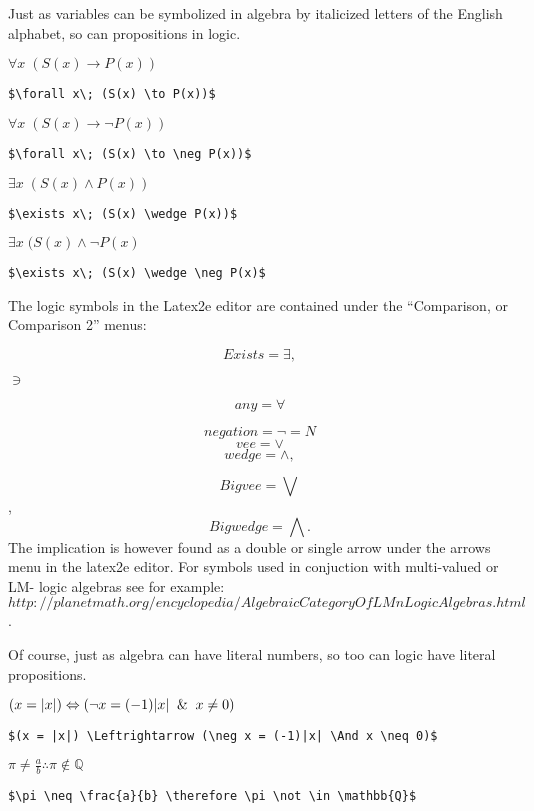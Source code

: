 Just as variables can be symbolized in algebra by italicized letters of the English alphabet, so can propositions in logic.

$\forall x\; (S(x) \to P(x))$

\verb=$\forall x\; (S(x) \to P(x))$=

$\forall x\; (S(x) \to \neg P(x))$

\verb=$\forall x\; (S(x) \to \neg P(x))$=

$\exists x\; (S(x) \wedge P(x))$

\verb=$\exists x\; (S(x) \wedge P(x))$=

$\exists x\; (S(x) \wedge \neg P(x)$

\verb=$\exists x\; (S(x) \wedge \neg P(x)$=



The logic symbols in the Latex2e editor are contained under the
``Comparison, or Comparison 2'' menus:

$$Exists = \exists ,$$

$\ni$

$$any = \forall$$

$$negation = \neg = N $$
$$vee = \vee$$
$$wedge = \wedge , $$

$$ Big vee =\bigvee$$,
$$Big wedge = \bigwedge .$$
The implication is however found as a double or single arrow under the arrows
menu in the latex2e editor. For symbols used in conjuction with multi-valued
or LM- logic algebras see for example:
$$http://planetmath.org/encyclopedia/AlgebraicCategoryOfLMnLogicAlgebras.html$$.

Of course, just as algebra can have literal numbers, so too can logic have literal propositions.

$(x = |x|) \Leftrightarrow (\neg x = (-1)|x| \And x \neq 0)$

\verb'$(x = |x|) \Leftrightarrow (\neg x = (-1)|x| \And x \neq 0)$'

$\pi \neq \frac{a}{b} \therefore \pi \not \in \mathbb{Q}$

\verb=$\pi \neq \frac{a}{b} \therefore \pi \not \in \mathbb{Q}$=

